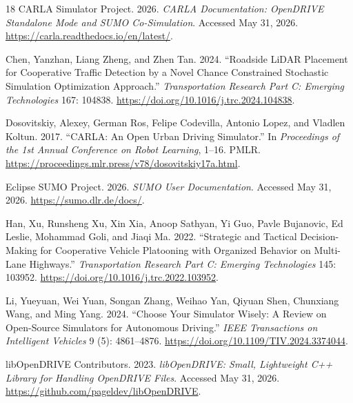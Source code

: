 \documentclass[10pt,numbered]{\selectedmanuscriptclass}
\begin{document}
\begin{thebibliography}{18}
{CARLA Simulator Project}. 2026. \emph{{CARLA} Documentation: OpenDRIVE
  Standalone Mode and SUMO Co-Simulation}. Accessed May 31, 2026.
  \url{https://carla.readthedocs.io/en/latest/}.

Chen, Yanzhan, Liang Zheng, and Zhen Tan. 2024. ``Roadside LiDAR Placement for
  Cooperative Traffic Detection by a Novel Chance Constrained Stochastic
  Simulation Optimization Approach.'' \emph{Transportation Research Part C:
  Emerging Technologies} 167: 104838.
  \url{https://doi.org/10.1016/j.trc.2024.104838}.

Dosovitskiy, Alexey, German Ros, Felipe Codevilla, Antonio Lopez, and Vladlen
  Koltun. 2017. ``{CARLA}: An Open Urban Driving Simulator.'' In
  \emph{Proceedings of the 1st Annual Conference on Robot Learning}, 1--16.
  PMLR. \url{https://proceedings.mlr.press/v78/dosovitskiy17a.html}.

{Eclipse SUMO Project}. 2026. \emph{{SUMO} User Documentation}. Accessed
  May 31, 2026. \url{https://sumo.dlr.de/docs/}.

Han, Xu, Runsheng Xu, Xin Xia, Anoop Sathyan, Yi Guo, Pavle Bujanovic, Ed
  Leslie, Mohammad Goli, and Jiaqi Ma. 2022. ``Strategic and Tactical
  Decision-Making for Cooperative Vehicle Platooning with Organized Behavior on
  Multi-Lane Highways.'' \emph{Transportation Research Part C: Emerging
  Technologies} 145: 103952. \url{https://doi.org/10.1016/j.trc.2022.103952}.

Li, Yueyuan, Wei Yuan, Songan Zhang, Weihao Yan, Qiyuan Shen, Chunxiang Wang,
  and Ming Yang. 2024. ``Choose Your Simulator Wisely: A Review on Open-Source
  Simulators for Autonomous Driving.'' \emph{IEEE Transactions on Intelligent
  Vehicles} 9 (5): 4861--4876.
  \url{https://doi.org/10.1109/TIV.2024.3374044}.

{libOpenDRIVE Contributors}. 2023. \emph{{libOpenDRIVE}: Small, Lightweight
  {C++} Library for Handling {OpenDRIVE} Files}. Accessed May 31, 2026.
  \url{https://github.com/pageldev/libOpenDRIVE}.


\end{thebibliography}
\end{document}
